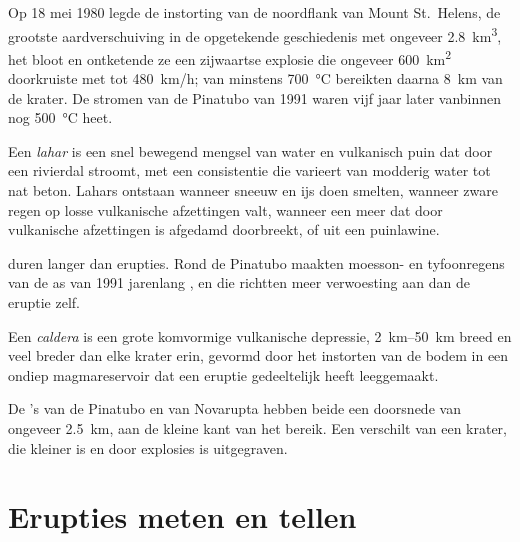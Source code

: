 Op 18 mei 1980 legde de instorting van de noordflank van Mount St.~Helens, de grootste
aardverschuiving in de opgetekende geschiedenis met ongeveer \qty{2.8}{km^3}, het  bloot en
ontketende ze een zijwaartse explosie die ongeveer \qty{600}{km^2} doorkruiste met tot
\qty{480}{km/h};  van minstens \qty{700}{\celsius} bereikten daarna
\qty{8}{km} van de krater. De stromen van de Pinatubo van 1991 waren vijf jaar later vanbinnen nog
\qty{500}{\celsius} heet.

\begin{definition}[Lahar]\label{def:b2:eruptive-styles:lahar}
Een \emph{lahar} is een snel bewegend mengsel van water en vulkanisch puin
dat door een rivierdal stroomt, met een consistentie die varieert van modderig water
tot nat beton. Lahars ontstaan wanneer  sneeuw en ijs doen smelten, wanneer
zware regen op losse vulkanische afzettingen valt, wanneer een meer dat door vulkanische
afzettingen is afgedamd doorbreekt, of uit een puinlawine.
\end{definition}

 duren langer dan erupties. Rond de Pinatubo maakten moesson- en tyfoonregens
van de as van 1991 jarenlang , en die richtten meer verwoesting aan dan de
eruptie zelf.

\begin{definition}[Caldera]\label{def:b2:eruptive-styles:caldera}
Een \emph{caldera} is een grote komvormige vulkanische depressie,
\qtyrange{2}{50}{km} breed en veel breder dan elke krater erin, gevormd door
het instorten van de bodem in een ondiep magmareservoir dat een eruptie
gedeeltelijk heeft leeggemaakt.
\end{definition}

De 's van de Pinatubo en van Novarupta hebben beide een doorsnede van ongeveer \qty{2.5}{km}, aan de
kleine kant van het bereik. Een  verschilt van een krater, die kleiner is en door explosies is uitgegraven.

\section{Erupties meten en tellen}


